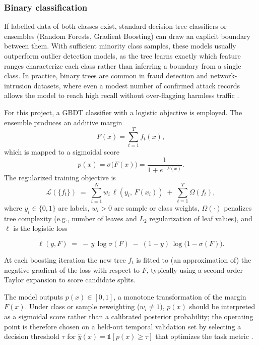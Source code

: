 \subsubsection{Binary classification}

If labelled data of both classes exist, standard decision-tree classifiers or ensembles (Random Forests, Gradient Boosting) can draw an explicit boundary between them. With sufficient minority class samples, these models usually outperform outlier detection models, as the tree learns exactly which feature ranges characterize each class rather than inferring a boundary from a single class. In practice, binary trees are common in fraud detection and network-intrusion datasets, where even a modest number of confirmed attack records allows the model to reach high recall without over-flagging harmless traffic \autocite{354051491,binary-classification-for-fraud-detection}.

For this project, a \ac{GBDT} classifier with a logistic objective is employed. The ensemble produces an additive margin
\[
F(x)=\sum_{t=1}^{T} f_t(x),
\]
which is mapped to a sigmoidal score
\begin{equation}
p(x)=\sigma\big(F(x)\big)=\frac{1}{1+e^{-F(x)}}.
\label{eq:gbdt-sigmoid}
\end{equation}
The regularized training objective is
\begin{equation}
\mathcal{L}(\{f_t\}) \;=\; \sum_{i=1}^{N} w_i\,\ell\!\left(y_i,\,F(x_i)\right) \;+\; \sum_{t=1}^{T} \Omega\!\left(f_t\right),
\label{eq:gbdt-objective}
\end{equation}
where \(y_i\in\{0,1\}\) are labels, \(w_i>0\) are sample or class weights, \(\Omega(\cdot)\) penalizes tree complexity (e.g., number of leaves and \(L_2\) regularization of leaf values), and \(\ell\) is the logistic loss

\begin{equation}
\ell(y,F) \;=\; -\,y\,\log \sigma(F)\;-\;(1-y)\,\log\bigl(1-\sigma(F)\bigr).
\label{eq:logistic-loss}
\end{equation}

At each boosting iteration the new tree \(f_t\) is fitted to (an approximation of) the negative gradient of the loss with respect to \(F\), typically using a second-order Taylor expansion to score candidate splits.

The model outputs \(p(x)\in[0,1]\), a monotone transformation of the margin \(F(x)\). Under class or sample reweighting (\(w_i\neq 1\)), \(p(x)\) should be interpreted as a sigmoidal score rather than a calibrated posterior probability; the operating point is therefore chosen on a held-out temporal validation set by selecting a decision threshold \(\tau\) for \(\hat{y}(x)=\mathbb{1}[p(x)\ge\tau]\) that optimizes the task metric \autocite{friedmanGreedyFunctionApproximation2000,chenXGBoostScalableTree2016}.


